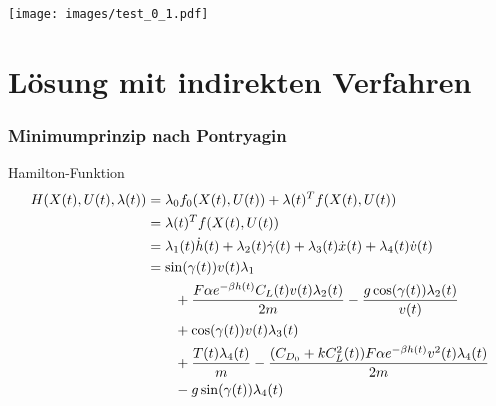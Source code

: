 \documentclass[aspectratio=169]{beamer}
\begin{document}
\begin{frame}
  \texttt{[image: images/test\_0\_1.pdf]}
\end{frame}

\section{Lösung mit indirekten Verfahren}
\begin{frame}
  \frametitle{Minimumprinzip nach Pontryagin}
  \scriptsize
  \begin{block}{Hamilton-Funktion}  
 \begin{align*} 
        H(X(t),U(t),\lambda(t)) &= \lambda_0 f_0(X(t),U(t)) + \lambda(t)^T f(X(t),U(t)) \\\
        &= \lambda(t)^T f(X(t),U(t)) \\\
        &= \lambda_1(t) \dot{h}(t) + \lambda_2(t) \dot{\gamma}(t) + \lambda_3(t) \dot{x}(t) + \lambda_4(t) \dot{v}(t) \\\
        &= \sin(\gamma(t)) v(t) \lambda_1 \\\
        &\hspace{7mm} + \dfrac{F \alpha e^{-\beta h(t)} C_L(t) v(t) \lambda_2(t)}{2m} - \dfrac{g \cos(\gamma(t)) \lambda_2(t)}{v(t)} \\\
        &\hspace{7mm} + \cos(\gamma(t)) v(t) \lambda_3(t) \\\
        &\hspace{7mm} + \dfrac{T(t) \lambda_4(t)}{m} - \dfrac{(C_{D_0} + k C_L^2(t)) F \alpha e^{-\beta h(t)} v^2(t) \lambda_4(t)}{2m} \\\
        &\hspace{7mm} - g \sin(\gamma(t)) \lambda_4(t)
\end{align*}
\end{block}
\end{frame}
\end{document}
